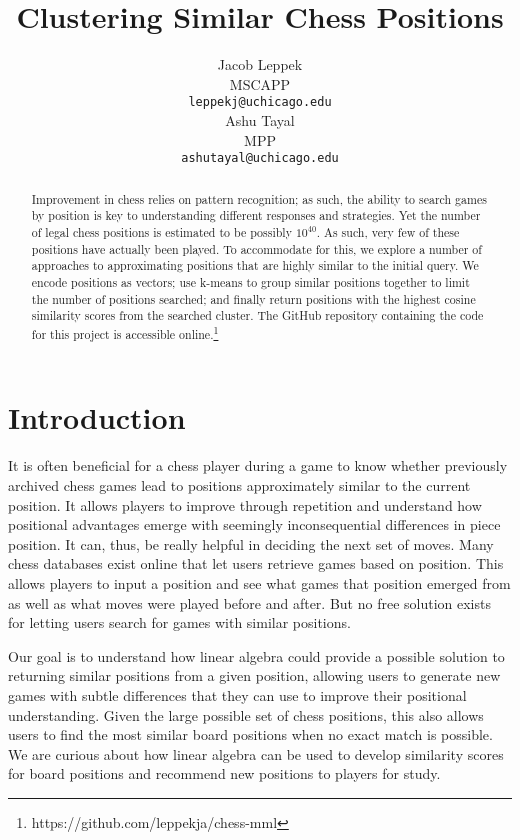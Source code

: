 \documentclass{article}
\title{Clustering Similar Chess Positions}
\author{%
  Jacob Leppek \\
  MSCAPP\\
  \texttt{leppekj@uchicago.edu} \\
\And
Ashu Tayal \\
MPP\\
\texttt{ashutayal@uchicago.edu} \\
}
\begin{document}
\maketitle

\begin{abstract}
   Improvement in chess relies on pattern recognition; as such, the ability to search
  games by position is key to understanding different responses and strategies. Yet the
  number of legal chess positions is estimated to be possibly $10^{40}$. As such, very few
  of these positions have actually been played. To accommodate for this, we explore a number
  of approaches to approximating positions that are highly similar to the initial query. We
  encode positions as vectors; use k-means to group similar positions together to limit the
  number of positions searched; and finally return positions with the highest cosine similarity
  scores from the searched cluster. The GitHub repository containing the code for this project is accessible online.\footnote{https://github.com/leppekja/chess-mml}
\end{abstract}

\section{Introduction}

    It is often beneficial for a chess player during a game to know whether previously archived chess games lead to positions approximately similar to the current position. It allows players to improve through repetition and understand how positional advantages emerge with seemingly inconsequential differences in piece position. It can, thus, be really helpful in deciding the next set of moves. Many chess databases exist online that let users retrieve games based on position. This allows players to input a position and see what games that position emerged from as well as what moves were played before and after. But no free solution exists for letting users search for games with similar positions.

 Our goal is to understand how linear algebra could provide a possible solution to returning similar positions from a given position, allowing users to generate new games with subtle differences that they can use to improve their positional understanding. Given the large possible set of chess positions, this also allows users to find the most similar board positions when no exact match is possible. We are curious about how linear algebra can be used to develop similarity scores for board positions and recommend new positions to players for study.
\end{document}
